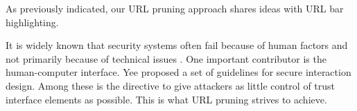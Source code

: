 
As previously indicated, our URL pruning approach shares ideas with URL bar highlighting.






It is widely known that security systems often fail because of human factors and not primarily because of technical issues \cite{fail}. One important contributor is the human-computer interface. Yee \cite{yee2005guidelines} proposed a set of guidelines for secure interaction design. Among these is the directive to give attackers as little control of trust interface elements as possible. This is what URL pruning strives to achieve.

